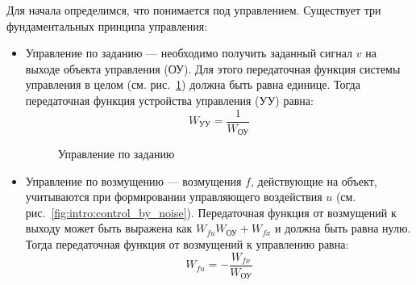 \documentclass[preprint,russian,a5paper,10pt,twoside]{ncc}
\begin{document}
Для начала определимся, что понимается под управлением. Существует три фундаментальных принципа управления:
\begin{itemize}
\item Управление по заданию --- необходимо получить заданный сигнал $v$ на выходе объекта управления (ОУ). Для этого передаточная функция системы управления в целом (см. рис.~\ref{fig:intro:control_by_target}) должна быть равна единице. Тогда передаточная функция устройства управления (УУ) равна:
\begin{equation}\label{equ:intro:control_by_target}
W_{\text{УУ}}=\frac{1}{W_{\text{ОУ}}}
\end{equation}

\begin{figure}[ht] \centering		%
\footnotesize \caption{Управление по заданию\label{fig:intro:control_by_target}}
\end{figure}

\item Управление по возмущению --- возмущения $f$, действующие на объект, учитываются при формировании управляющего воздействия $u$ (см. рис.~\ref{fig:intro:control_by_noise}). Передаточная функция от возмущений к выходу может быть выражена как $ W_{fu}W_\text{ОУ}+W_{fx} $ и должна быть равна нулю. Тогда передаточная функция от возмущений к управлению равна:
\begin{equation}\label{equ:intro:control_by_noise}
W_{fu}=-\frac{W_{fx}}{W_\text{ОУ}}
\end{equation}


\end{itemize}
\end{document}
